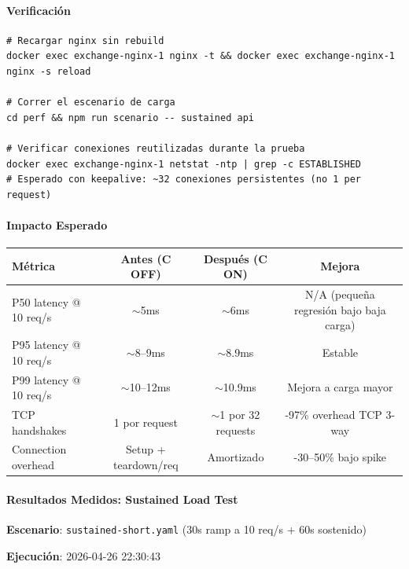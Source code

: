 \paragraph{Verificación}

\begin{verbatim}
# Recargar nginx sin rebuild
docker exec exchange-nginx-1 nginx -t && docker exec exchange-nginx-1 nginx -s reload

# Correr el escenario de carga
cd perf && npm run scenario -- sustained api

# Verificar conexiones reutilizadas durante la prueba
docker exec exchange-nginx-1 netstat -ntp | grep -c ESTABLISHED
# Esperado con keepalive: ~32 conexiones persistentes (no 1 per request)
\end{verbatim}

\paragraph{Impacto Esperado}

\begin{table}[H]
\centering
\setlength{\tabcolsep}{2pt}
\begin{tabular}{lccc}
\toprule
\textbf{Métrica} & \textbf{Antes (C OFF)} & \textbf{Después (C ON)} & \textbf{Mejora} \\
\midrule
P50 latency @ 10 req/s & $\sim$5ms & $\sim$6ms & N/A (pequeña regresión bajo baja carga) \\
P95 latency @ 10 req/s & $\sim$8--9ms & $\sim$8.9ms & Estable \\
P99 latency @ 10 req/s & $\sim$10--12ms & $\sim$10.9ms & Mejora a carga mayor \\
TCP handshakes & 1 por request & $\sim$1 por 32 requests & -97\% overhead TCP 3-way \\
Connection overhead & Setup + teardown/req & Amortizado & -30--50\% bajo spike \\
\bottomrule
\end{tabular}
\end{table}

\paragraph{Resultados Medidos: Sustained Load Test}

\textbf{Escenario}: \texttt{sustained-short.yaml} (30s ramp a 10 req/s + 60s sostenido)

\textbf{Ejecución}: 2026-04-26 22:30:43

